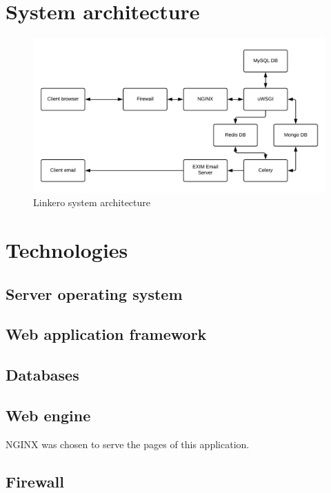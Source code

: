 \section{System architecture}

\begin{figure}[h!]
\centering
\includegraphics[scale=0.8]{imgs/SystemArchitecture.pdf}
\caption{Linkero system architecture}
\label{fig:sysarch}
\end{figure}

\section{Technologies}

\subsection{Server operating system}

\subsection{Web application framework}

\subsection{Databases}

\subsection{Web engine}
NGINX was chosen to serve the pages of this application.

\subsection{Firewall}

